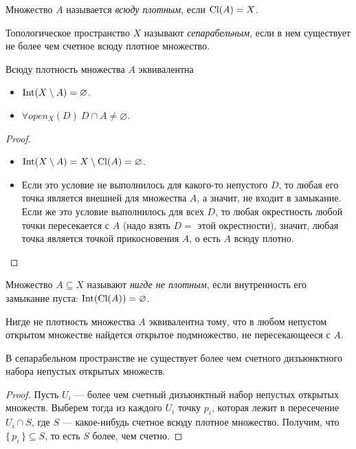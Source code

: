 \begin{definition}
    Множество $A$ называется \textit{всюду плотным}, если $\operatorname{Cl}(A) = X$.
\end{definition}

\begin{definition}
    Топологическое пространство $X$ называют \textit{сепарабельным}, если
    в нем существует не более чем счетное всюду плотное множество.
\end{definition}

\begin{remark}
	Всюду плотность множества $A$ эквивалентна
	\begin{itemize}
		\item $\operatorname{Int}(X \setminus A) = \varnothing$.
		\item $\forall open_X(D)~ D \cap A \neq \varnothing$.
	\end{itemize}
\end{remark}
\begin{proof}
	\enewline
	\begin{itemize}
		\item $\operatorname{Int}(X \setminus A) = X \setminus \operatorname{Cl}(A) = \varnothing$.
		\item Если это условие не выполнилось для какого-то непустого $D$,
			то любая его точка является внешней для множества $A$, а значит,
			не входит в замыкание. Если же это условие выполнилось для всех $D$, 
			то любая окрестность любой точки пересекается с $A$ (надо
			взять $D = $ этой окрестности), значит, любая точка является 
			точкой прикосновения $A$, о есть $A$ всюду плотно.
	\end{itemize}
\end{proof}

\begin{definition}
	Множество $A \subseteq X$ называют \textit{нигде не плотным}, если
	внутренность его замыкание пуста: $\operatorname{Int}(\operatorname{Cl}(A)) = \varnothing$.
\end{definition}

\begin{remark}
	Нигде не плотность множества $A$ эквивалентна тому, что
	в любом непустом открытом множестве найдется открытое подмножество,
	не пересекающееся с $A$.
\end{remark}

\begin{theorem}
	В сепарабельном пространстве не существует более чем счетного
	дизъюнктного набора непустых открытых множеств.
\end{theorem}
\begin{proof}
	Пусть $U_i$ --- более чем счетный дизъюнктный набор непустых открытых
	множеств. Выберем тогда из каждого $U_i$ точку $p_i$, которая
	лежит в пересечение $U_i \cap S$, где $S$ --- какое-нибудь
	счетное всюду плотное множество. Получим, что $\{\, p_i \,\} \subseteq S$,
	то есть $S$ более, чем счетно.
\end{proof}

